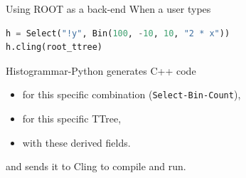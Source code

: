 \documentclass{beamer}
\begin{document}
\begin{frame}[fragile]{Using ROOT as a back-end}
When a user types

\begin{center}
\begin{minipage}{0.9\linewidth}
\begin{lstlisting}[language=python, basicstyle=\ttfamily\small]
h = Select("!y", Bin(100, -10, 10, "2 * x"))
h.cling(root_ttree)
\end{lstlisting}
\end{minipage}
\end{center}

Histogrammar-Python generates C++ code

\begin{itemize}
\item for this specific combination ({\tt\small Select-Bin-Count}),
\item for this specific TTree,
\item with these derived fields.
\end{itemize}

and sends it to Cling to compile and run.
\end{frame}
\end{document}
